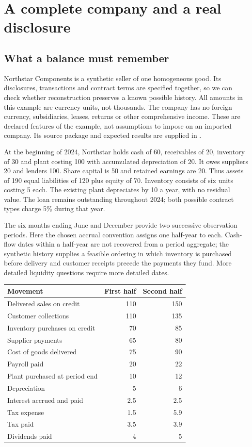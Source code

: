 \chapter{A complete company and a real disclosure}
\label{ch:case}

\section{What a balance must remember}

Northstar Components is a synthetic seller of one homogeneous good. Its
disclosures, transactions and contract terms are specified together, so we can
check whether reconstruction preserves a known possible history. All amounts
in this example are currency units, not thousands. The company has no foreign
currency, subsidiaries, leases, returns or other comprehensive income. These
are declared features of the example, not assumptions to impose on an imported
company. Its source package and expected results are supplied in
.

At the beginning of 2024, Northstar holds cash of 60, receivables of 20,
inventory of 30 and plant costing 100 with accumulated depreciation of 20.
It owes suppliers 20 and lenders 100. Share capital is 50 and retained earnings
are 20. Thus assets of 190 equal liabilities of 120 plus equity of 70.
Inventory consists of six units costing 5 each. The existing plant depreciates
by 10 a year, with no residual value. The loan remains outstanding throughout
2024; both possible contract types charge 5\% during that year.

The six months ending June and December provide two successive observation
periods. Here the chosen accrual convention assigns one half-year to each.
Cash-flow dates within a half-year are not recovered from a period aggregate;
the synthetic history supplies a feasible ordering in which inventory is
purchased before delivery and customer receipts precede the payments they fund.
More detailed liquidity questions require more detailed dates.

\begin{center}
\begin{tabular}{lrr}
\toprule Movement & First half & Second half\\\midrule
Delivered sales on credit &110&150\\
Customer collections &110&135\\
Inventory purchases on credit &70&85\\
Supplier payments &65&80\\
Cost of goods delivered &75&90\\
Payroll paid &20&22\\
Plant purchased at period end &10&12\\
Depreciation &5&6\\
Interest accrued and paid &2.5&2.5\\
Tax expense &1.5&5.9\\
Tax paid &3.5&3.9\\
Dividends paid &4&5\\\bottomrule
\end{tabular}
\end{center}

